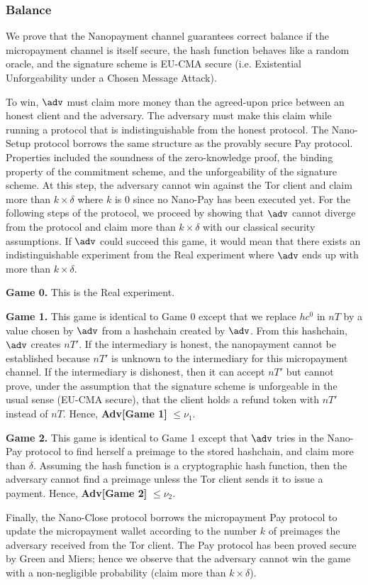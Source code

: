 \subsubsection{Balance}

We prove that the Nanopayment channel guarantees correct balance if the micropayment channel is itself secure, the hash function behaves like a random oracle, and the signature scheme is EU-CMA secure (i.e. Existential Unforgeability under a Chosen Message Attack).

To win, $\adv$ must claim more money than the agreed-upon price between an honest client and the adversary.
The adversary must make this claim while running a protocol that is indistinguishable from the honest protocol.
The Nano-Setup protocol borrows the same structure as the provably secure Pay protocol.
Properties included the soundness of the zero-knowledge proof, the binding property of the commitment scheme, and the unforgeability of the signature scheme.
At this step, the adversary cannot win against the Tor client and claim more than $k \times \delta$ where $k$ is 0 since no Nano-Pay has been executed yet.
For the following steps of the protocol, we proceed by showing that $\adv$ cannot diverge from the protocol and claim more than $k \times \delta$ with our classical security assumptions.
If $\adv$ could succeed this game, it would mean that there exists an indistinguishable experiment from the Real experiment where $\adv$ ends up with more than $k \times \delta$.

\textbf{Game 0.} This is the Real experiment.

\textbf{Game 1.}
This game is identical to Game 0 except that we replace $hc^0$ in $nT$ by a value chosen by $\adv$ from a hashchain created by $\adv$.
From this hashchain, $\adv$ creates $nT'$.
If the intermediary is honest, the nanopayment cannot be established because $nT'$ is unknown to the intermediary for this micropayment channel.
If the intermediary is dishonest, then it can accept $nT'$ but cannot prove, under the assumption that the signature scheme is unforgeable in the usual sense (EU-CMA secure), that the client holds a refund token with $nT'$ instead of $nT$.
Hence, \textbf{Adv[Game 1]} $\leq \nu_1$.

\textbf{Game 2.}
This game is identical to Game 1 except that $\adv$ tries in the Nano-Pay protocol to find herself a preimage to the stored hashchain, and claim more than $\delta$.
Assuming the hash function is a cryptographic hash function, then the adversary cannot find a preimage unless the Tor client sends it to issue a payment.
Hence, \textbf{Adv[Game 2]} $\leq \nu_2$.

Finally, the Nano-Close protocol borrows the micropayment Pay protocol to update the micropayment wallet according to the number $k$ of preimages the adversary received from the Tor client.
The Pay protocol has been proved secure by Green and Miers; hence we observe that the adversary cannot win the game with a non-negligible probability (claim more than $k \times \delta$).


